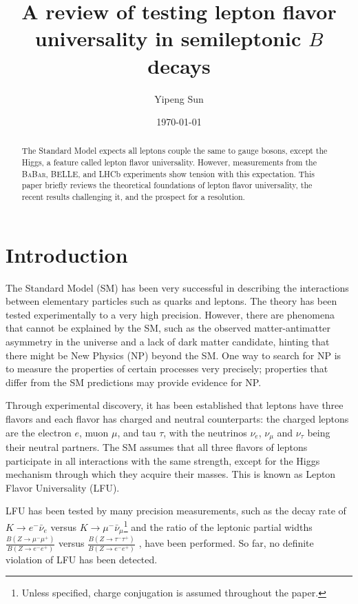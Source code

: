 \documentclass[12pt,letterpaper]{article}
\title{
    A review of testing lepton flavor universality in semileptonic $B$ decays
}
\author{Yipeng Sun}
\affil{Department of Physics, University of Maryland}
\date{\today}
\def\BaBar/{\textsc{BaBar}}
\begin{document}
\maketitle

\begin{abstract}
    The Standard Model expects all leptons couple the same to gauge bosons,
    except the Higgs, a feature called lepton flavor universality.
    However, measurements from the \BaBar/, BELLE, and LHCb experiments show
    tension with this expectation.
    This paper briefly reviews the theoretical foundations of lepton flavor
    universality, the recent results challenging it, and the prospect for a
    resolution.
\end{abstract}

\section{Introduction}
The Standard Model (SM) has been very successful in describing the interactions
between elementary particles such as quarks and leptons.
The theory has been tested experimentally to a very high precision.
However, there are phenomena that cannot be explained by the SM, such as
the observed matter-antimatter asymmetry in the universe and a lack of dark
matter candidate, hinting that there might be New Physics (NP) beyond the SM.
One way to search for NP is to measure the properties of certain processes
very precisely;
properties that differ from the SM predictions may provide evidence for NP.

Through experimental discovery, it has been established that leptons have three
flavors and each flavor has charged and neutral counterparts:
the charged leptons are the electron $e$, muon $\mu$, and tau $\tau$,
with the neutrinos $\nu_e$, $\nu_\mu$ and $\nu_\tau$ being their neutral
partners.
The SM assumes that all three flavors of leptons participate in all
interactions with the same strength, except for the Higgs mechanism through
which they acquire their masses.
This is known as Lepton Flavor Universality (LFU).

LFU has been tested by many precision measurements, such as the decay rate
of $K \rightarrow e^- \bar{\nu}_e$ versus
$K \rightarrow \mu^- \bar{\nu}_\mu$\footnote{
    Unless specified, charge conjugation is assumed throughout the paper.
} \cite{Ciezarek:2017yzh} and the ratio of the leptonic partial widths
$\frac{B(Z \rightarrow \mu^- \mu^+)}{B(Z \rightarrow e^- e^+)}$ versus
$\frac{B(Z \rightarrow \tau^- \tau^+)}{B(Z \rightarrow e^- e^+)}$
\cite{ALEPH:2005ab}, have been performed.
So far, no definite violation of LFU has been detected.
\end{document}
